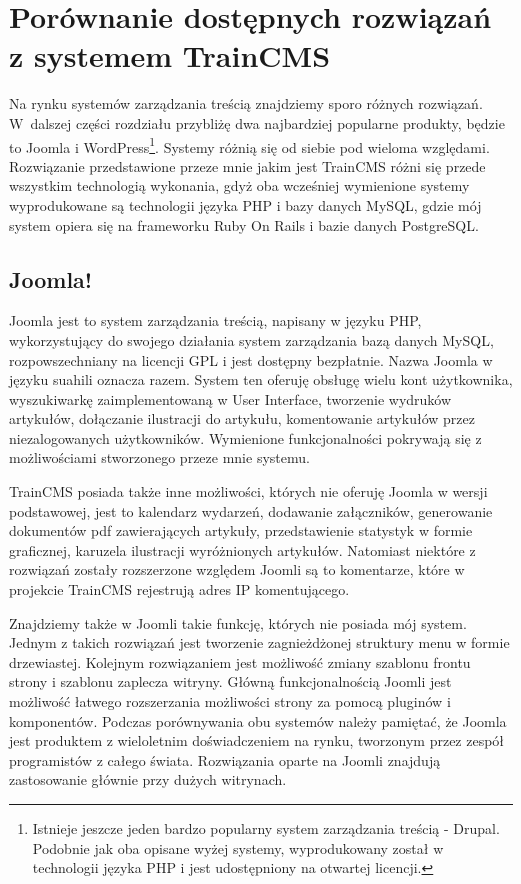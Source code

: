 \documentclass[openright]{xmgr}
\begin{document}
\section{Porównanie dostępnych rozwiązań z systemem TrainCMS}

Na rynku systemów zarządzania treścią znajdziemy sporo różnych rozwiązań. W~dalszej części rozdziału przybliżę dwa najbardziej popularne produkty, będzie to Joomla i WordPress\footnote{Istnieje jeszcze jeden bardzo popularny system zarządzania treścią - Drupal. Podobnie jak oba opisane wyżej systemy, wyprodukowany został w technologii języka PHP i jest udostępniony na otwartej licencji.}. Systemy różnią się od siebie pod wieloma względami. Rozwiązanie przedstawione przeze mnie jakim jest TrainCMS różni się  przede wszystkim technologią wykonania, gdyż oba wcześniej wymienione systemy wyprodukowane są technologii języka PHP i bazy danych MySQL, gdzie mój system opiera się na frameworku Ruby On Rails i bazie danych PostgreSQL.

\subsection{Joomla!}

Joomla jest to system zarządzania treścią, napisany w języku PHP, wykorzystujący do swojego działania system zarządzania bazą danych MySQL, rozpowszechniany na licencji GPL i jest dostępny bezpłatnie. Nazwa Joomla w języku suahili oznacza razem.   
System ten oferuję obsługę wielu kont użytkownika, wyszukiwarkę zaimplementowaną w User Interface, tworzenie wydruków artykułów, dołączanie ilustracji do artykułu, komentowanie artykułów przez niezalogowanych użytkowników. Wymienione funkcjonalności pokrywają się z możliwościami stworzonego przeze mnie systemu. 

TrainCMS posiada także inne możliwości, których nie oferuję Joomla w wersji podstawowej, jest to kalendarz wydarzeń, dodawanie załączników, generowanie dokumentów pdf zawierających artykuły, przedstawienie statystyk w formie graficznej, karuzela ilustracji wyróżnionych artykułów. Natomiast niektóre z rozwiązań zostały rozszerzone względem Joomli są to komentarze, które w projekcie TrainCMS rejestrują adres IP komentującego. 

Znajdziemy także w Joomli takie funkcję, których nie posiada mój system. Jednym z takich rozwiązań jest tworzenie zagnieżdżonej struktury menu w formie drzewiastej. Kolejnym rozwiązaniem jest możliwość zmiany szablonu frontu strony i szablonu zaplecza witryny. Główną funkcjonalnością Joomli jest możliwość łatwego rozszerzania możliwości strony za pomocą pluginów i komponentów. Podczas porównywania obu systemów należy pamiętać, że Joomla jest produktem z wieloletnim doświadczeniem na rynku, tworzonym przez zespół programistów z całego świata. Rozwiązania oparte na Joomli znajdują zastosowanie głównie przy dużych witrynach.
\end{document}
